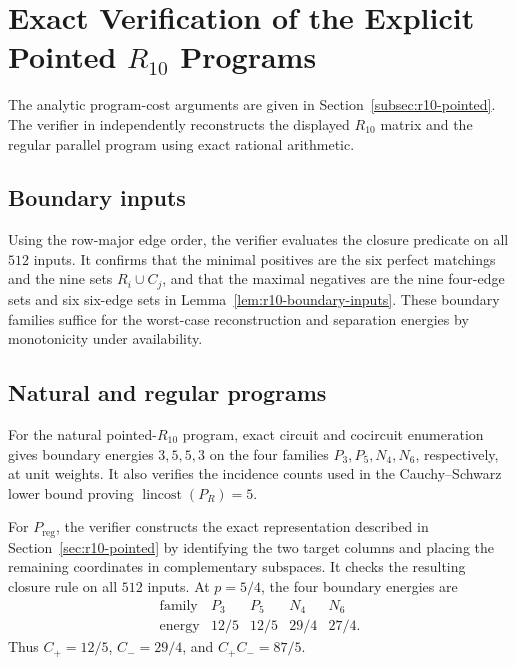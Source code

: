 \documentclass[11pt]{article}
\numberwithin{equation}{section}
\theoremstyle{remark}
\begin{document}
\section{Exact Verification of the Explicit Pointed \texorpdfstring{$R_{10}$}{R10} Programs}
\label{app:r10-program-verification}

The analytic program-cost arguments are given in
Section~\ref{subsec:r10-pointed}. The verifier in
 independently reconstructs the
displayed $R_{10}$ matrix and the regular parallel program using exact
rational arithmetic.

\subsection{Boundary inputs}
\label{app:r10-program-boundary}

Using the row-major edge order, the verifier evaluates the closure predicate
on all $512$ inputs. It confirms that the minimal positives are the six
perfect matchings and the nine sets $R_i\cup C_j$, and that the maximal negatives are
the nine four-edge sets and six six-edge sets in
Lemma~\ref{lem:r10-boundary-inputs}. These boundary families suffice for the
worst-case reconstruction and separation energies by monotonicity under
availability.

\subsection{Natural and regular programs}
\label{app:r10-natural-program-verification}
\label{app:r10-regular-program-verification}

For the natural pointed-$R_{10}$ program, exact circuit and cocircuit
enumeration gives boundary energies $3,5,5,3$ on the four families
$P_3,P_5,N_4,N_6$, respectively, at unit weights. It also verifies the
incidence counts used in the Cauchy--Schwarz lower bound proving
$\operatorname{lincost}(P_R)=5$.

For $P_{\mathrm{reg}}$, the verifier constructs the exact representation
described in Section~\ref{sec:r10-pointed} by identifying the two target
columns and placing the remaining coordinates in complementary subspaces. It
checks the resulting closure rule on all $512$ inputs. At $p=5/4$, the four boundary
energies are
\begin{equation}
\begin{array}{c|cccc}
\text{family} & P_3 & P_5 & N_4 & N_6\\
\hline
\text{energy} & 12/5 & 12/5 & 29/4 & 27/4.
\end{array}
\end{equation}
Thus $C_+=12/5$, $C_-=29/4$, and $C_+C_-=87/5$.
\end{document}
